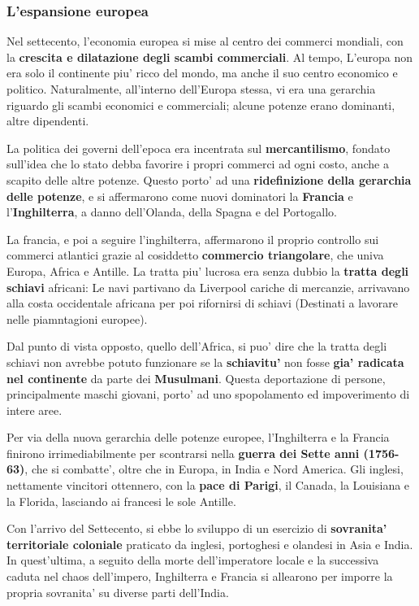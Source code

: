 \documentclass{article}
\begin{document}
{{    \subsubsection{L'espansione europea}
    Nel settecento, l'economia europea si mise al centro dei commerci mondiali, con la \textbf{crescita e dilatazione degli scambi commerciali}. Al tempo, L'europa non era solo il continente piu' ricco del mondo, ma anche il suo centro economico e politico. Naturalmente, all'interno dell'Europa stessa, vi era una gerarchia riguardo gli scambi economici e commerciali; alcune potenze erano dominanti, altre dipendenti.
    
    La politica dei governi dell'epoca era incentrata sul \textbf{mercantilismo}, fondato sull'idea che lo stato debba favorire i propri commerci ad ogni costo, anche a scapito delle altre potenze. Questo porto' ad una \textbf{ridefinizione della gerarchia delle potenze}, e si affermarono come nuovi dominatori la \textbf{Francia} e l'\textbf{Inghilterra}, a danno dell'Olanda, della Spagna e del Portogallo.

    La francia, e poi a seguire l'inghilterra, affermarono il proprio controllo sui commerci atlantici grazie al cosiddetto \textbf{commercio triangolare}, che univa Europa, Africa e Antille. La tratta piu' lucrosa era senza dubbio la \textbf{tratta degli schiavi} africani: Le navi partivano da Liverpool cariche di mercanzie, arrivavano alla costa occidentale africana per poi rifornirsi di schiavi \small{(Destinati a lavorare nelle piamntagioni europee)}.

    Dal punto di vista opposto, quello dell'Africa, si puo' dire che la tratta degli schiavi non avrebbe potuto funzionare se la \textbf{schiavitu'} non fosse \textbf{gia' radicata nel continente} da parte dei \textbf{Musulmani}. Questa deportazione di persone, principalmente maschi giovani, porto' ad uno spopolamento ed impoverimento di intere aree.

    Per via della nuova gerarchia delle potenze europee, l'Inghilterra e la Francia finirono irrimediabilmente per scontrarsi nella \textbf{guerra dei Sette anni (1756-63)}, che si combatte', oltre che in Europa, in India e Nord America. Gli inglesi, nettamente vincitori ottennero, con la \textbf{pace di Parigi}, il Canada, la Louisiana e la Florida, lasciando ai francesi le sole Antille.

    Con l'arrivo del Settecento, si ebbe lo sviluppo di un esercizio di \textbf{sovranita' territoriale coloniale} praticato da inglesi, portoghesi e olandesi in Asia e India. In quest'ultima, a seguito della morte dell'imperatore locale e la successiva caduta nel chaos dell'impero, Inghilterra e Francia si allearono per imporre la propria sovranita' su diverse parti dell'India.

}}
\end{document}
